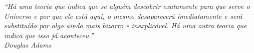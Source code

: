 \begin{epigrafe}
    \vspace*{\fill}
	\begin{flushright}
		\textit{``Há uma teoria que indica que se alguém descobrir exatamente para que serve o
			Universo e por que ele está aqui, o mesmo desaparecerá imediatamente e será
			substituído por algo ainda mais bizarro e inexplicável. Há uma outra teoria
			que indica que isso já aconteceu.''\\
		Douglas Adams}
	\end{flushright}
\end{epigrafe}
